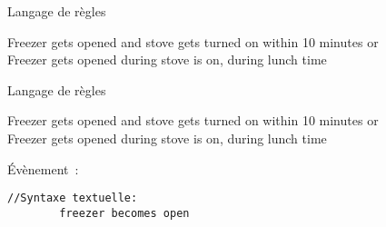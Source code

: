 \begin{frame}[fragile]{Langage de règles}
  \vspace*{-9.65mm}
  \begin{coloredbox}[gray]{}
    \begin{footnotesize}
      Freezer \colorbox{black!2}{gets opened} \colorbox{black!2}{and} stove gets turned on \colorbox{black!2}{within 10 minutes} or \\Freezer gets opened during stove \colorbox{black!2}{is on}, during lunch time
    \end{footnotesize}
  \end{coloredbox}
  \vfill
  \begin{minipage}{.31\linewidth}
  \end{minipage}
  \hfill
  \begin{minipage}{.31\linewidth} 
  \end{minipage}
  \hfill
  \begin{minipage}{.33\linewidth} 
    \begin{center}
    \end{center}
  \end{minipage}
\end{frame}

\begin{frame}[fragile]{Langage de règles}
  \addtocounter{framenumber}{-1}
  \begin{coloredbox}[gray]{}
    \begin{footnotesize}
      Freezer \colorbox{checked!50}{gets opened} \colorbox{black!2}{and} stove gets turned on \colorbox{black!2}{within 10 minutes} or \\Freezer gets opened during stove \colorbox{black!2}{is on}, during lunch time
    \end{footnotesize}
  \end{coloredbox}
  \vfill
  \begin{minipage}{.31\linewidth}
    \begin{coloredbox}[checked]{Évènement~:}
      \begin{lstlisting}[language=MaloyaText]
        //Syntaxe textuelle:
        freezer becomes open
      \end{lstlisting}
    \end{coloredbox}
  \end{minipage}
  \hfill
  \begin{minipage}{.31\linewidth} 
  \end{minipage}
  \hfill
  \begin{minipage}{.33\linewidth} 
    \begin{center}
    \end{center}
  \end{minipage}
\end{frame}


